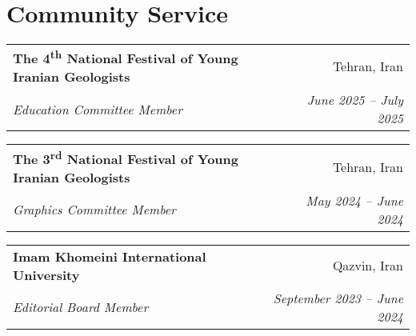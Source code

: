 \documentclass[letterpaper,11pt]{article}
\makeatletter
\newcommand{\ressubheading}[4]{%
	\begin{tabular*}{\textwidth}{l@{\cftdotfill{\cftsecdotsep}\extracolsep{\fill}}r}
		\textbf{#1} & #2 \\
		\textit{#3} & \textit{#4} \\
	\end{tabular*}\vspace{-8pt}
}
\makeatother
\begin{document}
		\section{Community Service}
		\vspace{-0.9em} 
		\ressubheading{The 4\textsuperscript{th} National Festival of Young Iranian Geologists}{Tehran, Iran}{Education Committee Member}{June 2025 – July 2025}
		
		\vspace{0.3em} 
		\ressubheading{The 3\textsuperscript{rd} National Festival of Young Iranian Geologists}{Tehran, Iran}{Graphics Committee Member}{May 2024 – June 2024}
		
		\vspace{0.3em} 
		\ressubheading{Imam Khomeini International University}{Qazvin, Iran}{Editorial Board Member}{September 2023 – June 2024}
		
		\vspace{-1.5em} 
		
		
\end{document}
